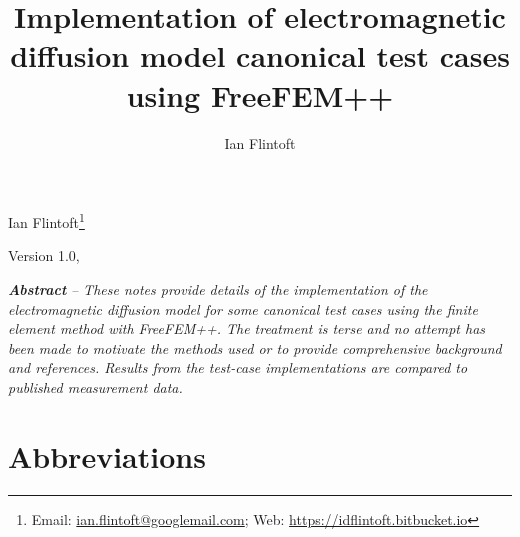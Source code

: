 \documentclass[a4paper]{article}
\title{Implementation of electromagnetic diffusion model canonical test cases using FreeFEM++}
\author{Ian Flintoft}
\newcommand{\mydate}{Version 1.0, \formatdate{24}{2}{2018}}
\numberwithin{equation}{section}
\begin{document}
\clearpage{}
\vspace{5mm}
\thispagestyle{plain}
{\centering\large 
Ian Flintoft\footnote{ Email: \href{mailto:ian.flintoft@googlemail.com}{ian.flintoft@googlemail.com}; 
Web: \url{https://idflintoft.bitbucket.io}}
\par}
\vspace{5mm}
{\centering
\mydate
\par}
\vspace{5mm}
\textbf{\textit{Abstract}}\textit{ -- These notes provide details of the implementation of the 
electromagnetic diffusion model for some canonical test cases using the finite element method
with FreeFEM++. The treatment is terse and no attempt has been made to motivate the methods used 
or to provide comprehensive background and references. Results from the test-case implementations
are compared to published measurement data.
}
%
\setcounter{tocdepth}{3}
\renewcommand\contentsname{Contents}
\tableofcontents
%
\newpage

\section*{Abbreviations}
\label{sc:abbrev}
\end{document}
